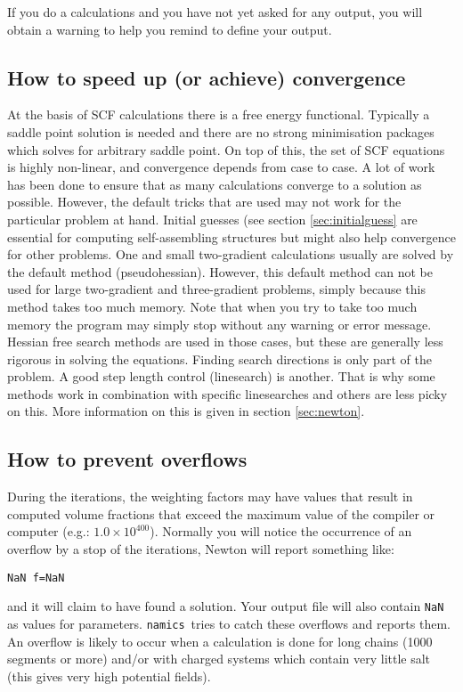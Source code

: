 \documentclass{article}
\newcommand{\namics}{{\tt namics}}
\begin{document}
If you do a calculations and you have not yet asked for any output, you will obtain a warning to help you remind to define your output. 

\subsection{How to speed up (or achieve) convergence}
At the basis of SCF calculations there is a free energy functional. Typically a saddle point solution is needed and there are no strong minimisation packages which solves for arbitrary saddle point. On top of this, the set of SCF equations is highly non-linear, and convergence depends from case to case. A lot of work has been done to ensure that as many calculations converge to a solution as possible. However, the default tricks that are used may not work for the particular problem at hand. Initial guesses (see section \ref{sec:initialguess} are essential for computing self-assembling structures but might also help convergence for other problems. One and small two-gradient calculations usually are solved by the default method (pseudohessian). However, this default method can not be used for large two-gradient and three-gradient problems, simply because this method takes too much memory. Note that when you try to take too much memory the  program may simply stop without any warning or error message. Hessian free search methods are used in those cases, but these are generally less rigorous in solving the equations. Finding search directions is only part of the problem. A good step length control (linesearch) is another. That is why some methods work in combination with specific linesearches and others are less picky on this. More information on this is given in section \ref{sec:newton}.

\subsection{How to prevent overflows}
\label{sec:overflow}
During the iterations, the weighting factors may have values that result in computed volume fractions that exceed the maximum value of the compiler or computer (e.g.: $1.0 \times 10^{400}$).  Normally you will notice the occurrence of an overflow by a stop of the iterations, Newton will report something like:
\begin{verbatim}
NaN f=NaN
\end{verbatim}
and it will claim to have found a solution.  Your output file will also contain {\tt NaN} as values for parameters.  \namics\ tries to catch these overflows and reports them.  An overflow is likely to occur when a calculation is done for long chains (1000 segments or more) and/or with charged systems which contain very little salt (this gives very high potential fields).  
\end{document}
